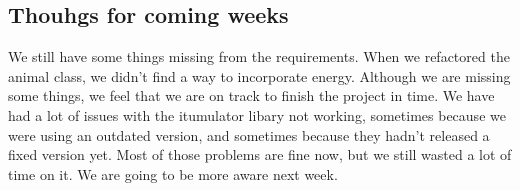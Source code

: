 \documentclass[11pt]{article}
\begin{document}
    \subsection*{Thouhgs for coming weeks}
    We still have some things missing from the requirements. When we refactored the animal class, we didn't find a way to incorporate energy. 
    Although we are missing some things, we feel that we are on track to finish the project in time. We have had a lot of issues with the 
    itumulator libary not working, sometimes because we were using an outdated version, and sometimes because they hadn't released a fixed version yet. 
    Most of those problems are fine now, but we still wasted a lot of time on it. We are going to be more aware next week. 
\end{document}
